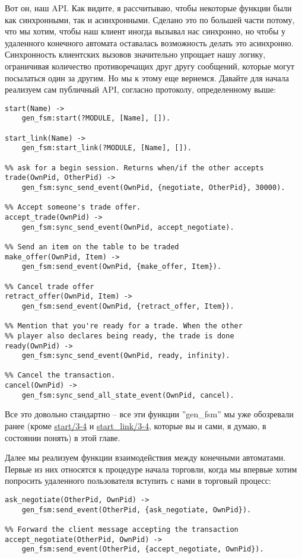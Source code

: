 Вот он, наш API.
Как видите, я рассчитываю, чтобы некоторые функции были как синхронными, так и асинхронными.
Сделано это по большей части потому, что мы хотим, чтобы наш клиент иногда вызывал нас синхронно, но чтобы у удаленного конечного автомата оставалась возможность делать это асинхронно.
Синхронность клиентских вызовов значительно упрощает нашу логику, ограничивая количество противоречащих друг другу сообщений, которые могут посылаться один за другим.
Но мы к этому еще вернемся.
Давайте для начала реализуем сам публичный API, согласно протоколу, определенному выше:
\begin{lstlisting}[style=erlang]
%%% PUBLIC API
start(Name) ->
	gen_fsm:start(?MODULE, [Name], []).
 
start_link(Name) ->
	gen_fsm:start_link(?MODULE, [Name], []).
 
%% ask for a begin session. Returns when/if the other accepts
trade(OwnPid, OtherPid) ->
	gen_fsm:sync_send_event(OwnPid, {negotiate, OtherPid}, 30000).
 
%% Accept someone's trade offer.
accept_trade(OwnPid) ->
	gen_fsm:sync_send_event(OwnPid, accept_negotiate).
 
%% Send an item on the table to be traded
make_offer(OwnPid, Item) ->
	gen_fsm:send_event(OwnPid, {make_offer, Item}).
 
%% Cancel trade offer
retract_offer(OwnPid, Item) ->
	gen_fsm:send_event(OwnPid, {retract_offer, Item}).
 
%% Mention that you're ready for a trade. When the other
%% player also declares being ready, the trade is done
ready(OwnPid) ->
	gen_fsm:sync_send_event(OwnPid, ready, infinity).
 
%% Cancel the transaction.
cancel(OwnPid) ->
	gen_fsm:sync_send_all_state_event(OwnPid, cancel).
\end{lstlisting}

Все это довольно стандартно \--- все эти функции ''gen\_fsm'' мы уже обозревали ранее (кроме \href{http://erldocs.com/18.0/stdlib/gen_fsm.html#start/3}{start/3-4} и \href{http://erldocs.com/18.0/stdlib/gen_fsm.html#start_link/3}{start\_link/3-4}, которые вы и сами, я думаю, в состоянии понять) в этой главе.

Далее мы реализуем функции взаимодействия между конечными автоматами.
Первые из них относятся к процедуре начала торговли, когда мы впервые хотим попросить удаленного пользователя вступить с нами в торговый процесс:
\begin{lstlisting}[style=erlang]
%% Ask the other FSM's Pid for a trade session
ask_negotiate(OtherPid, OwnPid) ->
	gen_fsm:send_event(OtherPid, {ask_negotiate, OwnPid}).
 
%% Forward the client message accepting the transaction
accept_negotiate(OtherPid, OwnPid) ->
	gen_fsm:send_event(OtherPid, {accept_negotiate, OwnPid}).
\end{lstlisting}

